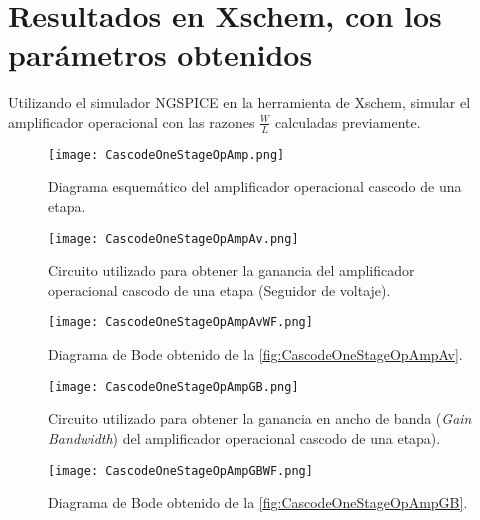 \section{Resultados en Xschem, con los parámetros obtenidos \label{sec:s2}}

\begin{center}
	\begin{minipage}{12cm}
		\begin{tcolorbox}[title=Actividad 2]
			Utilizando el simulador NGSPICE en la herramienta de Xschem, simular el amplificador operacional con las razones $\frac{W}{L}$ calculadas previamente.
		\end{tcolorbox}	
	\end{minipage}
\end{center}

\begin{figure}[ht]
	\centering
	\texttt{[image: CascodeOneStageOpAmp.png]}
	\caption{Diagrama esquemático del amplificador operacional cascodo de una etapa. \label{fig:CascodeOneStageOpAmp}}
\end{figure}

\begin{figure}[ht]
	\centering
	\texttt{[image: CascodeOneStageOpAmpAv.png]}
	\caption{Circuito utilizado para obtener la ganancia del amplificador operacional cascodo de una etapa (Seguidor de voltaje). \label{fig:CascodeOneStageOpAmpAv}}
\end{figure}

\begin{figure}[ht]
	\centering
	\texttt{[image: CascodeOneStageOpAmpAvWF.png]}
	\caption{Diagrama de Bode obtenido de la \autoref{fig:CascodeOneStageOpAmpAv}. \label{fig:CascodeOneStageOpAmpAvWF}}
\end{figure}

\begin{figure}[ht]
	\centering
	\texttt{[image: CascodeOneStageOpAmpGB.png]}
	\caption{Circuito utilizado para obtener la ganancia en ancho de banda (\textit{Gain Bandwidth}) del amplificador operacional cascodo de una etapa). \label{fig:CascodeOneStageOpAmpGB}}
\end{figure}

\begin{figure}[ht]
	\centering
	\texttt{[image: CascodeOneStageOpAmpGBWF.png]}
	\caption{Diagrama de Bode obtenido de la \autoref{fig:CascodeOneStageOpAmpGB}. \label{fig:CascodeOneStageOpAmpGBWF}}
\end{figure}

